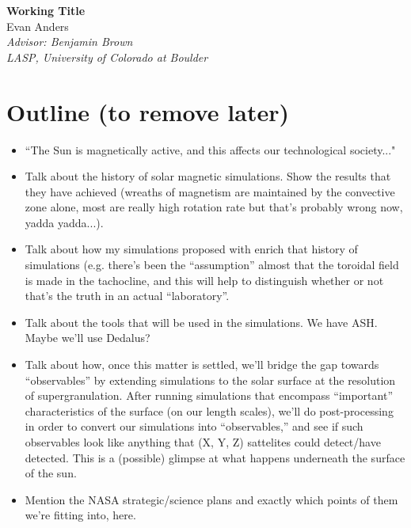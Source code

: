 \documentclass[aasms,12pt]{article}
\begin{document}
\begin{center}
   \Large\textbf{Working Title}\\
   \vspace{0.4cm}
   \large{Evan Anders}\\
   \vspace{0.4cm}
   \normalsize\textit{Advisor: Benjamin Brown}\\
   \normalsize\textit{LASP, University of Colorado at Boulder}\\
\end{center}





\section{Outline (to remove later)}
\begin{itemize}
\item ``The Sun is magnetically active, and this affects our technological
	society..."
\item Talk about the history of solar magnetic simulations.  Show the results that
	they have achieved (wreaths of magnetism are maintained by the convective
	zone alone, most are really high rotation rate but that's probably
	wrong now, yadda yadda...). 
\item Talk about how my simulations proposed with enrich that history of
	simulations (e.g. there's been the ``assumption'' almost that the
	toroidal field is made in the tachocline, and this will help to distinguish
	whether or not that's the truth in an actual ``laboratory''.
\item Talk about the tools that will be used in the simulations.  We have ASH.
	Maybe we'll use Dedalus?
\item Talk about how, once this matter is settled, we'll bridge the gap towards
	``observables'' by extending simulations to the solar surface at the
	resolution of supergranulation.  After running simulations that encompass
	``important'' characteristics of the surface (on our length scales),
	we'll do post-processing in order to convert our simulations into
	``observables,'' and see if such observables look like anything that
	(X, Y, Z) sattelites could detect/have detected.  This is a (possible)
	glimpse at what happens underneath the surface of the sun.
\item Mention the NASA strategic/science plans and exactly which points of them
	we're fitting into, here.
\end{itemize}
\end{document}

